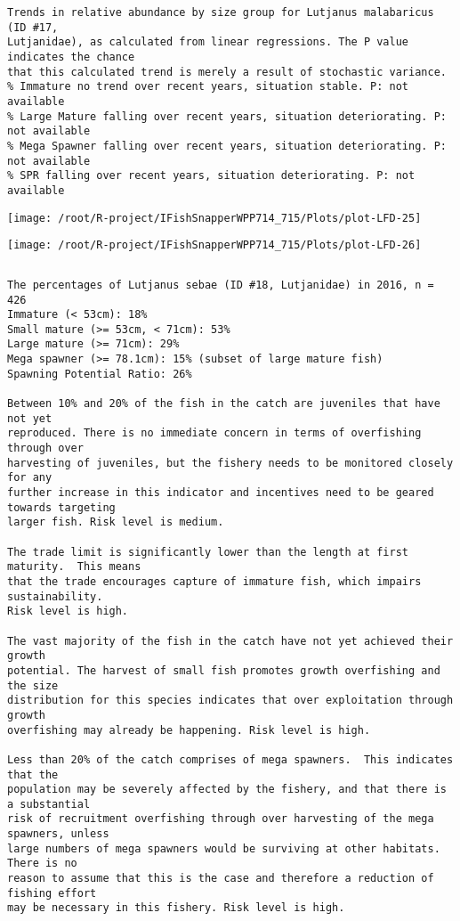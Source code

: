 \documentclass{report}\usepackage[]{graphicx}\usepackage[]{color}
\makeatletter
\def\maxwidth{ %
  \ifdim\Gin@nat@width>\linewidth
    \linewidth
  \else
    \Gin@nat@width
  \fi
}
\newenvironment{kframe}{%
 \def\at@end@of@kframe{}%
 \ifinner\ifhmode%
  \def\at@end@of@kframe{\end{minipage}}%
  \begin{minipage}{\columnwidth}%
 \fi\fi%
 \def\FrameCommand##1{\hskip\@totalleftmargin \hskip-\fboxsep
 \colorbox{shadecolor}{##1}\hskip-\fboxsep
     \hskip-\linewidth \hskip-\@totalleftmargin \hskip\columnwidth}%
 \MakeFramed {\advance\hsize-\width
   \@totalleftmargin\z@ \linewidth\hsize
   \@setminipage}}%
 {\par\unskip\endMakeFramed%
 \at@end@of@kframe}
\newenvironment{knitrout}{}{} %
\makeatother
\begin{document}
\begin{knitrout}
\begin{kframe}
\begin{verbatim}
Trends in relative abundance by size group for Lutjanus malabaricus (ID #17,
Lutjanidae), as calculated from linear regressions. The P value indicates the chance
that this calculated trend is merely a result of stochastic variance.
% Immature no trend over recent years, situation stable. P: not available
% Large Mature falling over recent years, situation deteriorating. P: not available
% Mega Spawner falling over recent years, situation deteriorating. P: not available
% SPR falling over recent years, situation deteriorating. P: not available
\end{verbatim}
\end{kframe}
\texttt{[image: /root/R-project/IFishSnapperWPP714\_715/Plots/plot-LFD-25]} 

\texttt{[image: /root/R-project/IFishSnapperWPP714\_715/Plots/plot-LFD-26]} 
\begin{kframe}\begin{verbatim}
\end{verbatim}
\end{kframe}
\clearpage
\newpage
\begin{kframe}\begin{verbatim}The percentages of Lutjanus sebae (ID #18, Lutjanidae) in 2016, n = 426
Immature (< 53cm): 18%
Small mature (>= 53cm, < 71cm): 53%
Large mature (>= 71cm): 29%
Mega spawner (>= 78.1cm): 15% (subset of large mature fish)
Spawning Potential Ratio: 26%
 
Between 10% and 20% of the fish in the catch are juveniles that have not yet
reproduced. There is no immediate concern in terms of overfishing through over
harvesting of juveniles, but the fishery needs to be monitored closely for any
further increase in this indicator and incentives need to be geared towards targeting
larger fish. Risk level is medium.

The trade limit is significantly lower than the length at first maturity.  This means
that the trade encourages capture of immature fish, which impairs sustainability.
Risk level is high.

The vast majority of the fish in the catch have not yet achieved their growth
potential. The harvest of small fish promotes growth overfishing and the size
distribution for this species indicates that over exploitation through growth
overfishing may already be happening. Risk level is high.

Less than 20% of the catch comprises of mega spawners.  This indicates that the
population may be severely affected by the fishery, and that there is a substantial
risk of recruitment overfishing through over harvesting of the mega spawners, unless
large numbers of mega spawners would be surviving at other habitats. There is no
reason to assume that this is the case and therefore a reduction of fishing effort
may be necessary in this fishery. Risk level is high.
 

\end{verbatim}
\end{kframe}
\end{knitrout}
\end{document}
